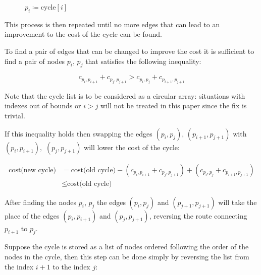 \begin{figure}[h]
\begin{subfigure}[c]{.4\textwidth}
{
        }
    \end{subfigure}
    \caption*{$p_i\coloneq\mbox{cycle}[i]$}

\end{figure}

This process is then repeated until no more edges that can lead to an improvement to the cost of the cycle can be found.

To find a pair of edges that can be changed to improve the cost it is sufficient to find a pair of nodes $p_i$, $p_j$ that satisfies the following inequality:

$$c_{p_i,p_{i+1}}+c_{p_j,p_{j+1}} > c_{p_i,p_{j}}+c_{p_{i+1},p_{j+1}}$$

Note that the cycle list is to be considered as a circular array: situations with indexes out of bounds or $i>j$ will not be treated in this paper since the fix is trivial.

If this inequality holds then swapping the edges $(p_i,p_j),\,(p_{i+1},p_{j+1})$ with $(p_i,p_{i+1}),$ $(p_{j},p_{j+1})$ will lower the cost of the cycle:

\begin{align*}
    \mbox{cost(new cycle)}&=\mbox{cost(old cycle)}-(c_{p_i,p_{i+1}}+c_{p_j,p_{j+1}})+(c_{p_i,p_{j}}+c_{p_{i+1},p_{j+1}})\\
    &\leq\mbox{cost(old cycle)}
\end{align*}

After finding the nodes $p_i$, $p_j$ the edges $(p_i, p_j)$ and $(p_{j+1}, p_{j+1})$ will take the place of the edges $(p_i, p_{i+1})$ and $(p_j, p_{j+1})$, reversing the route connecting $p_{i+1}$ to $p_{j}$.

Suppose the cycle is stored as a list of nodes ordered following the order of the nodes in the cycle, then this step can be done simply by reversing the list from the index $i+1$ to the index $j$:

